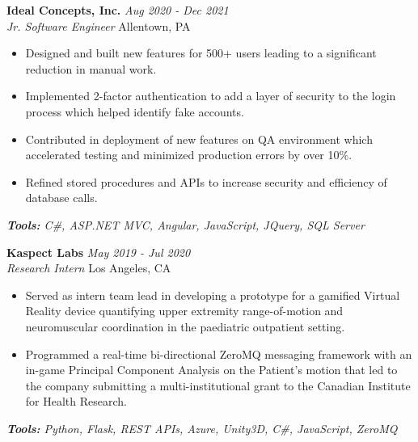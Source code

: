 \documentclass[letterpaper,10pt]{article}
\newcommand{\organization}[4]{
    \vspace{1.5pt}
    \textbf{#1} \hfill{\emph{#2}} \\
    \emph{#3} \hfill{#4} \\
    \vspace{3pt}
}
\newcommand{\toolsused}[1]{
    \vspace{1.5pt}
    \emph{#1}\\
    \vspace{3pt}
}
\newcommand{\bulletsBegin}{
    \vspace{1pt}
    \begin{minipage}{17.6cm}
    \begin{itemize}[leftmargin=0.6cm]
    \setlength\itemsep{-0.1em}
}
\newcommand{\bulletsEnd}{
    \end{itemize}\vspace{0pt}
    \end{minipage}
}
\begin{document}
    
    	\organization{Ideal Concepts, Inc.}{Aug 2020 - Dec 2021}
        {Jr. Software Engineer}{Allentown, PA}
        \bulletsBegin
            \item Designed and built new features for 500+ users leading to a significant reduction in manual work.
	    \vspace{-2pt}
            \item Implemented 2-factor authentication to add a layer of security to the login process which helped identify fake accounts.
            \item Contributed in deployment of new features on QA environment which accelerated testing and minimized production errors by over 10\%.
            \vspace{-2pt}
            \item Refined stored procedures and APIs to increase security and efficiency of database calls.
            \vspace{-2pt}
        \bulletsEnd
        \vspace{-4pt}
        \toolsused{\textbf{Tools:} C\#, ASP.NET MVC, Angular, JavaScript, JQuery, SQL Server}

        \organization{Kaspect Labs}{May 2019 - Jul 2020}
        {Research Intern}{Los Angeles, CA}
        \bulletsBegin
            \item Served as intern team lead in developing a prototype for a gamified Virtual Reality device quantifying upper extremity range-of-motion and neuromuscular coordination in the paediatric outpatient setting.
            \item Programmed a real-time bi-directional ZeroMQ messaging framework with an in-game Principal Component Analysis on the Patient’s motion that led to the company submitting a multi-institutional grant to the Canadian Institute for Health Research.
            \vspace{-2pt}
        \bulletsEnd
        \vspace{-4pt}
        \toolsused{\textbf{Tools:} Python, Flask, REST APIs, Azure, Unity3D, C\#, JavaScript, ZeroMQ}
        
\end{document}
